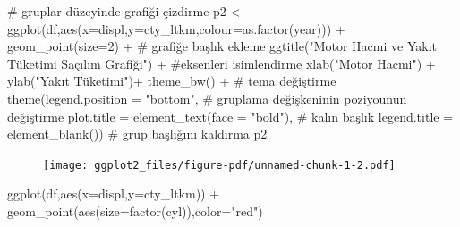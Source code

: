 \documentclass[
  letterpaper,
  DIV=11,
  numbers=noendperiod]{scrreprt}
\newenvironment{Shaded}{\begin{snugshade}}{\end{snugshade}}
\newcommand{\AttributeTok}[1]{\textcolor[rgb]{0.40,0.45,0.13}{#1}}
\newcommand{\CommentTok}[1]{\textcolor[rgb]{0.37,0.37,0.37}{#1}}
\newcommand{\DecValTok}[1]{\textcolor[rgb]{0.68,0.00,0.00}{#1}}
\newcommand{\FunctionTok}[1]{\textcolor[rgb]{0.28,0.35,0.67}{#1}}
\newcommand{\NormalTok}[1]{\textcolor[rgb]{0.00,0.23,0.31}{#1}}
\newcommand{\OtherTok}[1]{\textcolor[rgb]{0.00,0.23,0.31}{#1}}
\newcommand{\SpecialCharTok}[1]{\textcolor[rgb]{0.37,0.37,0.37}{#1}}
\newcommand{\StringTok}[1]{\textcolor[rgb]{0.13,0.47,0.30}{#1}}
\begin{document}
\begin{Shaded}
\begin{Highlighting}[]
\CommentTok{\# gruplar düzeyinde grafiği çizdirme}
\NormalTok{p2 }\OtherTok{\textless{}{-}} \FunctionTok{ggplot}\NormalTok{(df,}\FunctionTok{aes}\NormalTok{(}\AttributeTok{x=}\NormalTok{displ,}\AttributeTok{y=}\NormalTok{cty\_ltkm,}\AttributeTok{colour=}\FunctionTok{as.factor}\NormalTok{(year))) }\SpecialCharTok{+}
  \FunctionTok{geom\_point}\NormalTok{(}\AttributeTok{size=}\DecValTok{2}\NormalTok{) }\SpecialCharTok{+}
  \CommentTok{\# grafiğe başlık ekleme}
  \FunctionTok{ggtitle}\NormalTok{(}\StringTok{"Motor Hacmi ve Yakıt Tüketimi Saçılım Grafiği"}\NormalTok{) }\SpecialCharTok{+}
  \CommentTok{\#eksenleri isimlendirme}
  \FunctionTok{xlab}\NormalTok{(}\StringTok{"Motor Hacmi"}\NormalTok{) }\SpecialCharTok{+} 
  \FunctionTok{ylab}\NormalTok{(}\StringTok{"Yakıt Tüketimi"}\NormalTok{)}\SpecialCharTok{+}
  \FunctionTok{theme\_bw}\NormalTok{() }\SpecialCharTok{+} \CommentTok{\# tema değiştirme}
  \FunctionTok{theme}\NormalTok{(}\AttributeTok{legend.position =} \StringTok{"bottom"}\NormalTok{,  }\CommentTok{\# gruplama değişkeninin poziyounun değiştirme}
        \AttributeTok{plot.title =} \FunctionTok{element\_text}\NormalTok{(}\AttributeTok{face =} \StringTok{"bold"}\NormalTok{), }\CommentTok{\# kalın başlık}
        \AttributeTok{legend.title =} \FunctionTok{element\_blank}\NormalTok{()) }\CommentTok{\# grup başlığını kaldırma}
\NormalTok{p2  }
\end{Highlighting}
\end{Shaded}

\begin{figure}[H]

{\centering \texttt{[image: ggplot2\_files/figure-pdf/unnamed-chunk-1-2.pdf]}

}

\end{figure}

\begin{Shaded}
\begin{Highlighting}[]
\FunctionTok{ggplot}\NormalTok{(df,}\FunctionTok{aes}\NormalTok{(}\AttributeTok{x=}\NormalTok{displ,}\AttributeTok{y=}\NormalTok{cty\_ltkm)) }\SpecialCharTok{+}
  \FunctionTok{geom\_point}\NormalTok{(}\FunctionTok{aes}\NormalTok{(}\AttributeTok{size=}\FunctionTok{factor}\NormalTok{(cyl)),}\AttributeTok{color=}\StringTok{"red"}\NormalTok{)}
\end{Highlighting}
\end{Shaded}
\end{document}
